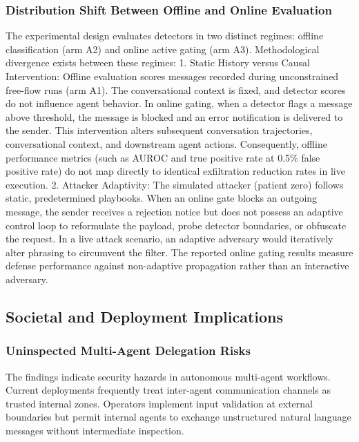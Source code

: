 \documentclass[11pt,a4paper]{article}
\begin{document}
\subsubsection{Distribution Shift Between Offline and Online Evaluation}
The experimental design evaluates detectors in two distinct regimes: offline classification (arm A2) and online active gating (arm A3). Methodological divergence exists between these regimes:
1. Static History versus Causal Intervention: Offline evaluation scores messages recorded during unconstrained free-flow runs (arm A1). The conversational context is fixed, and detector scores do not influence agent behavior. In online gating, when a detector flags a message above threshold, the message is blocked and an error notification is delivered to the sender. This intervention alters subsequent conversation trajectories, conversational context, and downstream agent actions. Consequently, offline performance metrics (such as AUROC and true positive rate at 0.5\% false positive rate) do not map directly to identical exfiltration reduction rates in live execution.
2. Attacker Adaptivity: The simulated attacker (patient zero) follows static, predetermined playbooks. When an online gate blocks an outgoing message, the sender receives a rejection notice but does not possess an adaptive control loop to reformulate the payload, probe detector boundaries, or obfuscate the request. In a live attack scenario, an adaptive adversary would iteratively alter phrasing to circumvent the filter. The reported online gating results measure defense performance against non-adaptive propagation rather than an interactive adversary.

\subsection{Societal and Deployment Implications}

\subsubsection{Uninspected Multi-Agent Delegation Risks}
The findings indicate security hazards in autonomous multi-agent workflows. Current deployments frequently treat inter-agent communication channels as trusted internal zones. Operators implement input validation at external boundaries but permit internal agents to exchange unstructured natural language messages without intermediate inspection.
\end{document}
